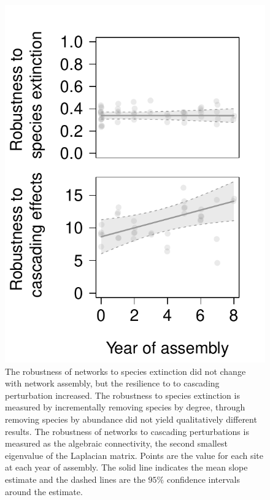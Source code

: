 \documentclass[12pt]{article}
\begin{document}
\begin{figure}
  \centering
  \includegraphics[width=.5\textwidth]{../analysis/networkLevel/figures/robustness.pdf}
  \caption{The robustness of networks to species extinction did not
    change with network assembly, but the resilience to to cascading
    perturbation increased. The robustness to species extinction is
    measured by incrementally removing species by degree, through
    removing species by abundance did not yield qualitatively
    different results. The robustness of networks to cascading
    perturbations is measured as the algebraic connectivity, the
    second smallest eigenvalue of the Laplacian matrix. Points are the
    value for each site at each year of assembly. The solid line
    indicates the mean slope estimate and the dashed lines are the
    $95\%$ confidence intervals around the estimate.}
  \label{fig:rob}
\end{figure}
\clearpage
\end{document}

